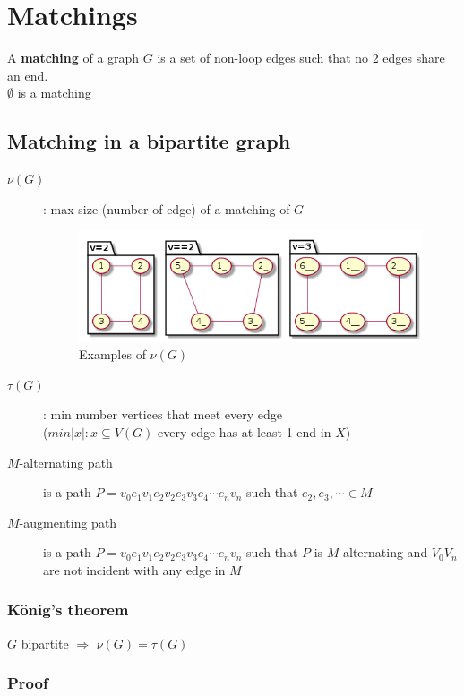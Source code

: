 \chapter{Matchings}
    A \textbf{matching} of a graph $G$ is a set of non-loop edges such that no 2 edges share an end.\\
    $\emptyset$ is a matching
    \section{Matching in a bipartite graph}
        \begin{description}
            \item[$\nu(G)$]: max size (number of edge) of a matching of $G$\\
                \begin{figure}[h]
                    \centering
                    \includegraphics[scale=0.5]{ressources/images/NuG.png}
                    \caption{Examples of $\nu(G)$}
                    \label{Tree}
                \end{figure}
            \item[$\tau(G)$]: min number vertices that meet every edge\\
                ($min|x|:x\subseteq V(G)$ every edge has at least 1 end in $X$)
            \item[$M$-alternating path] is a path $P=v_0 e_1 v_1 e_2 v_2 e_3 v_3 e_4 \cdots e_n v_n$ such that $e_2, e_3, \cdots \in M$
            \item[$M$-augmenting path] is a path $P=v_0 e_1 v_1 e_2 v_2 e_3 v_3 e_4 \cdots e_n v_n$ such that $P$ is $M$-alternating and $V_0 V_n$ are not incident with any edge in $M$
        \end{description}
        \subsection{König's theorem}
            $G$ bipartite $\Rightarrow$ $\nu(G)=\tau(G)$
        \subsection{Proof}
